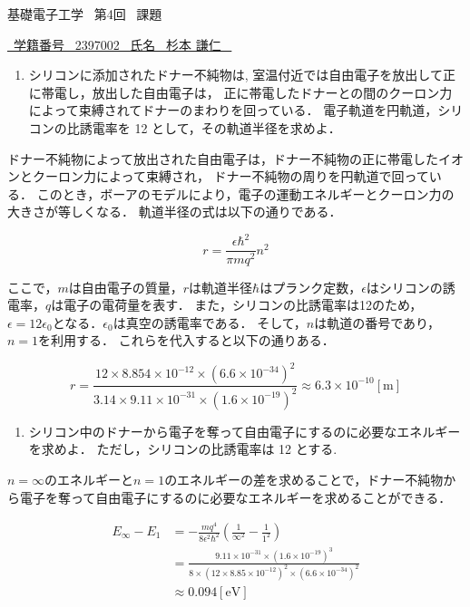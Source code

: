 \documentclass{classes/report}
\begin{document}
基礎電子工学 \ 第4回 \ 課題
\begin{flushright}
    \underline{\ 学籍番号 \ 2397002 \ 氏名 \ 杉本 謙仁 \ }
\end{flushright}

\bigskip

\begin{enumerate}
    \item シリコンに添加されたドナー不純物は,
          室温付近では自由電子を放出して正に帯電し，放出した自由電子は，
          正に帯電したドナーとの間のクーロン力によって束縛されてドナーのまわりを回っている．
          電子軌道を円軌道，シリコンの比誘電率を 12 として，その軌道半径を求めよ．
\end{enumerate}

ドナー不純物によって放出された自由電子は，ドナー不純物の正に帯電したイオンとクーロン力によって束縛され，
ドナー不純物の周りを円軌道で回っている．
このとき，ボーアのモデルにより，電子の運動エネルギーとクーロン力の大きさが等しくなる．
軌道半径の式は以下の通りである．

\begin{equation}
    r = \frac{\epsilon \hbar^2}{\pi mq^2}n^2
\end{equation}

ここで，$m$は自由電子の質量，$r$は軌道半径$\hbar$はプランク定数，$\epsilon$はシリコンの誘電率，$q$は電子の電荷量を表す．
また，シリコンの比誘電率は12のため，$\epsilon = 12\epsilon_0$となる．$\epsilon_0$は真空の誘電率である．
そして，$n$は軌道の番号であり，$n=1$を利用する．
これらを代入すると以下の通りある．

\begin{equation}
    r = \frac{12\times 8.854 \times 10^{-12} \times \left(6.6\times 10^{-34} \right)^2}{3.14 \times 9.11 \times 10^{-31} \times \left(1.6\times 10^{-19} \right)^2} \approx 6.3\times 10^{-10} [\mathrm{m}]
\end{equation}

\bigskip

\begin{enumerate}[resume]
    \item シリコン中のドナーから電子を奪って自由電子にするのに必要なエネルギーを求めよ．
          ただし，シリコンの比誘電率は 12 とする.
\end{enumerate}

$n=\infty$のエネルギーと$n=1$のエネルギーの差を求めることで，ドナー不純物から電子を奪って自由電子にするのに必要なエネルギーを求めることができる．

\begin{equation}
    \begin{split}
        E_\infty - E_1 &= - \frac{mq^4}{8\epsilon^2\hbar^2}\left(\frac{1}{\infty^2} - \frac{1}{1^2}\right) \\
        &= \frac{9.11\times 10^{-31} \times \left(1.6 \times 10^{-19} \right)^3}{8 \times \left(12 \times 8.85 \times 10^{-12} \right)^2 \times \left(6.6 \times 10^{-34} \right)^2} \\
        &\approx 0.094 [\mathrm{eV}]
    \end{split}
\end{equation}
\end{document}
